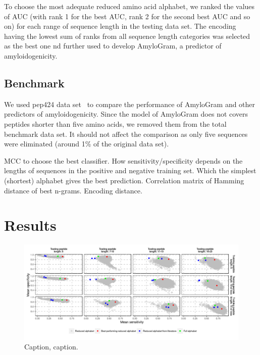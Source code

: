 \documentclass{bioinfo}
\begin{document}
\begin{methods}
To choose the most adequate reduced amino acid alphabet, we ranked the values of AUC (with rank 1 for the best AUC, rank 2 for the second best AUC and so on) for each range of sequence length in the testing data set. The encoding having the lowest sum of ranks from all sequence length categories was selected as the best one nd further used to develop AmyloGram, a predictor of amyloidogenicity.

\subsection{Benchmark}

We used pep424 data set~\cite{walsh_pasta_2014} to compare the performance of AmyloGram and other predictors of amyloidogenicity. Since the model of AmyloGram does not covers peptides shorter than five amino acids, we removed them from the total benchmark data set. It should not affect the comparison as only five sequences were eliminated (around 1\% of the original data set).

MCC to choose the best classifier.
How sensitivity/specificity depends on the lengths of sequences in the positive and negative training set.
Which the simplest (shortest) alphabet gives the best prediction.
Correlation matrix of Hamming distance of best n-grams.
Encoding distance.

\end{methods}

\section{Results}



\begin{figure}[!tpb]
\centerline{\includegraphics{figures/sesp_plot.png}}
\caption{Caption, caption.}\label{fig:sesp_plot}
\end{figure}
\end{document}
